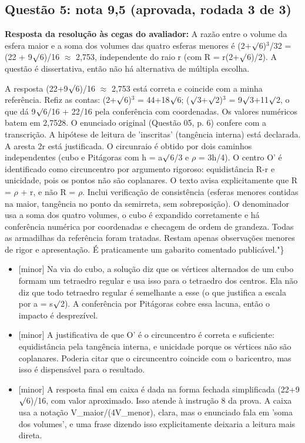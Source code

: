 \documentclass{article}%
\begin{document}
\subsection*{Questão 5: nota 9,5 (aprovada, rodada 3 de 3)}%
\textbf{Resposta da resolução às cegas do avaliador:} A razão entre o volume da esfera maior e a soma dos volumes das quatro esferas menores é (2+$\surd$6)$^3$/32 = (22 + 9$\surd$6)/16 $\approx$ 2,753, independente do raio r (com R = r(2+$\surd$6)/2). A questão é dissertativa, então não há alternativa de múltipla escolha.\par %
A resposta (22+9$\surd$6)/16 $\approx$ 2,753 está correta e coincide com a minha referência. Refiz as contas: (2+$\surd$6)$^3$ = 44+18$\surd$6; ($\surd$3+$\surd$2)$^3$ = 9$\surd$3+11$\surd$2, o que dá 9$\surd$6/16 + 22/16 pela conferência com coordenadas. Os valores numéricos batem em 2,7528. O enunciado original (Questão 05, p. 6) confere com a transcrição. A hipótese de leitura de 'inscritas' (tangência interna) está declarada. A aresta 2r está justificada. O circunraio é obtido por dois caminhos independentes (cubo e Pitágoras com h = a$\surd$6/3 e $\rho$ = 3h/4). O centro O' é identificado como circuncentro por argumento rigoroso: equidistância R-r e unicidade, pois os pontos não são coplanares. O texto avisa explicitamente que R = $\rho$ + r, e não R = $\rho$. Inclui verificação de consistência (esferas menores contidas na maior, tangência no ponto da semirreta, sem sobreposição). O denominador usa a soma dos quatro volumes, o cubo é expandido corretamente e há conferência numérica por coordenadas e checagem de ordem de grandeza. Todas as armadilhas da referência foram tratadas. Restam apenas observações menores de rigor e apresentação. É praticamente um gabarito comentado publicável."\}%
\begin{itemize}%
\item%
{[}minor{]} Na via do cubo, a solução diz que os vértices alternados de um cubo formam um tetraedro regular e usa isso para o tetraedro dos centros. Ela não diz que todo tetraedro regular é semelhante a esse (o que justifica a escala por a = s$\surd$2). A conferência por Pitágoras cobre essa lacuna, então o impacto é desprezível.%
\item%
{[}minor{]} A justificativa de que O' é o circuncentro é correta e suficiente: equidistância pela tangência interna, e unicidade porque os vértices não são coplanares. Poderia citar que o circuncentro coincide com o baricentro, mas isso é dispensável para o resultado.%
\item%
{[}minor{]} A resposta final em caixa é dada na forma fechada simplificada (22+9$\surd$6)/16, com valor aproximado. Isso atende à instrução 8 da prova. A caixa usa a notação V\_maior/(4V\_menor), clara, mas o enunciado fala em 'soma dos volumes', e uma frase dizendo isso explicitamente deixaria a leitura mais direta.%
\end{itemize}%
\end{document}
